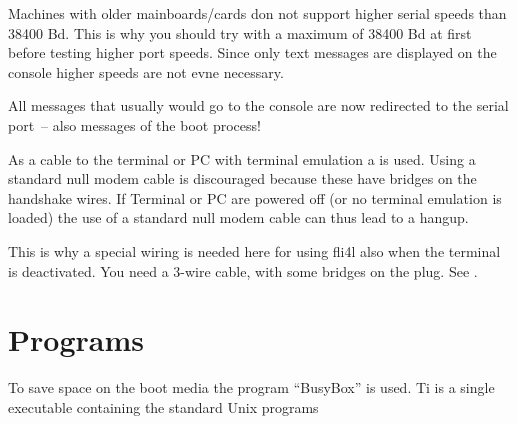     Machines with older mainboards/cards don not support higher serial 
    speeds than 38400 Bd. This is why you should try with a maximum of 38400 Bd 
    at first before testing higher port speeds. Since only text messages are
    displayed on the console higher speeds are not evne necessary.

    All messages that usually would go to the console are now redirected 
    to the serial port~-- also messages of the boot process!

    As a cable to the terminal or PC with terminal emulation a 
     is used. Using a standard null modem
    cable is discouraged because these have bridges on the handshake wires.
    If Terminal or PC are powered off (or no terminal emulation is loaded) the use
    of a standard null modem cable can thus lead to a hangup.

    This is why a special wiring is needed here for using fli4l also when the 
    terminal is deactivated. You need a 3-wire cable, with some bridges on the plug.
    See .




    \section{Programs}

    To save space on the boot media the program ``BusyBox'' is used. Ti is a single executable
    containing the standard Unix programs

